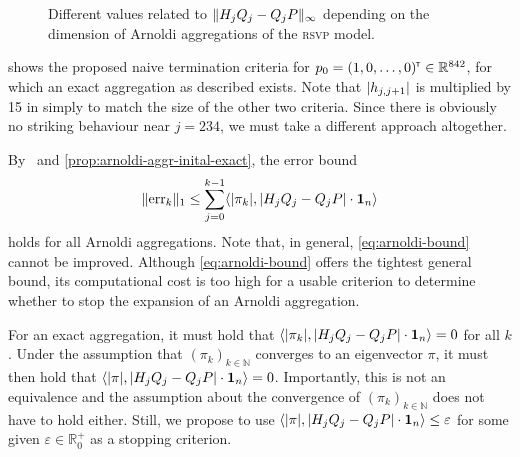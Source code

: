 \documentclass[runningheads]{llncs}
\newcommand*{\bbN}{\mathbb{N}}
\newcommand*{\bbR}{\mathbb{R}}
\newcommand*{\errvec}{\mathrm{err}}
\newcommand*{\abbrev}[1]{\textsc{#1}}
\newcommand*{\transp}{^{\mkern-1.5mu{\scriptscriptstyle\mathsf{T}}}}
\DeclarePairedDelimiter{\abs}{\lvert}{\rvert}
\DeclarePairedDelimiter{\norm}{\lVert}{\rVert}
\DeclarePairedDelimiter{\inp}{\langle}{\rangle}
\begin{document}
\begin{figure}[ht]
    \caption{Different values related to $\norm{H_j Q_j - Q_j P}_\infty$ depending on the dimension of Arnoldi aggregations of the \abbrev{rsvp} model.}
    \label{fig:rsvp-no-conv}
\end{figure}
 shows the proposed naive termination criteria for $p_0 = (1, 0, \dots, 0)\transp \in \bbR^{842}$, for which an exact aggregation as described exists.
Note that $\abs{h_{j, j + 1}}$ is multiplied by 15 in  simply to match the size of the other two criteria.
Since there is obviously no striking behaviour near $j = 234$, we must take a different approach altogether.

By~\cite[Thm.~4~(i)]{michel2025formalbounds} and \cref{prop:arnoldi-aggr-inital-exact}, the error bound
\begin{equation}\label{eq:arnoldi-bound}
    \norm{\errvec_k}_1 \leq \sum_{j = 0}^{k - 1} \inp*{\abs{\pi_k}, \abs{H_j Q_j - Q_j P} \cdot \mathbf{1}_n}
\end{equation}
holds for all Arnoldi aggregations.
Note that, in general, \cref{eq:arnoldi-bound} cannot be improved.
Although \cref{eq:arnoldi-bound} offers the tightest general bound, its computational cost is too high for a usable criterion to determine whether to stop the expansion of an Arnoldi aggregation.

For an exact aggregation, it must hold that $\inp*{\abs{\pi_k}, \abs{H_j Q_j - Q_j P} \cdot \mathbf{1}_n} = 0$ for all $k$.
Under the assumption that $(\pi_k)_{k \in \bbN}$ converges to an eigenvector $\pi$, it must then hold that $\inp*{\abs{\pi}, \abs{H_j Q_j - Q_j P} \cdot \mathbf{1}_n} = 0$.
Importantly, this is not an equivalence and the assumption about the convergence of $(\pi_k)_{k \in \bbN}$ does not have to hold either.
Still, we propose to use $\inp*{\abs{\pi}, \abs{H_j Q_j - Q_j P} \cdot \mathbf{1}_n} \leq \varepsilon$ for some given $\varepsilon \in \bbR_0^+$ as a stopping criterion.
\end{document}
